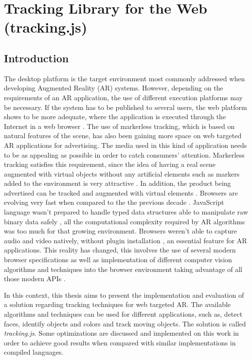 \chapter{Tracking Library for the Web (tracking.js)} %
\label{cha:ar_library_for_the_web}

\section{Introduction} %
\label{sec:ar_library_for_the_web:introduction}

The desktop platform is the target environment most commonly addressed when developing Augmented Reality (AR) systems. However, depending on the requirements of an AR application, the use of different execution platforms may be necessary. If the system has to be published to several users, the web platform shows to be more adequate, where the application is executed through the Internet in a web browser \cite{Pablo2013}.
The use of markerless tracking, which is based on natural features of the scene, has also been gaining more space on web targeted AR applications for advertising. The media used in this kind of application needs to be as appealing as possible in order to catch consumers’ attention. Markerless tracking satisfies this requirement, since the idea of having a real scene augmented with virtual objects without any artificial elements such as markers added to the environment is very attractive \cite{Pablo2013}. In addition, the product being advertised can be tracked and augmented with virtual elements \cite{Pablo2013}.
Browsers are evolving very fast when compared to the the previous decade \cite{Hickson2013}. JavaScript language \cite{International2009,MDN2013} wasn't prepared to handle typed data structures \cite{TypedArray2013} able to manipulate raw binary data safely \cite{Canvas2013}, all the computational complexity required by AR algorithms was too much for that growing environment. Browsers weren't able to capture audio and video \cite{MediaCapture2013,WebRTC2013} natively, without plugin installation \cite{Flash2013}, an essential feature for AR applications. This reality has changed, this involves the use of several modern browser specifications \cite{Hickson2013,WC2006} as well as implementation of different computer vision algorithms and techniques into the browser environment taking advantage of all those modern APIs \cite{Hickson2013,WC2006}.

In this context, this thesis aims to present the implementation and evaluation of a solution regarding tracking techniques for web targeted AR. The available algorithms and techniques can be used for different applications, such as, detect faces, identify objects and colors and track moving objects. The solution is called \textit{tracking.js}. Some optimizations are discussed and implemented on this work in order to achieve good results when compared with similar implementations in compiled languages.

